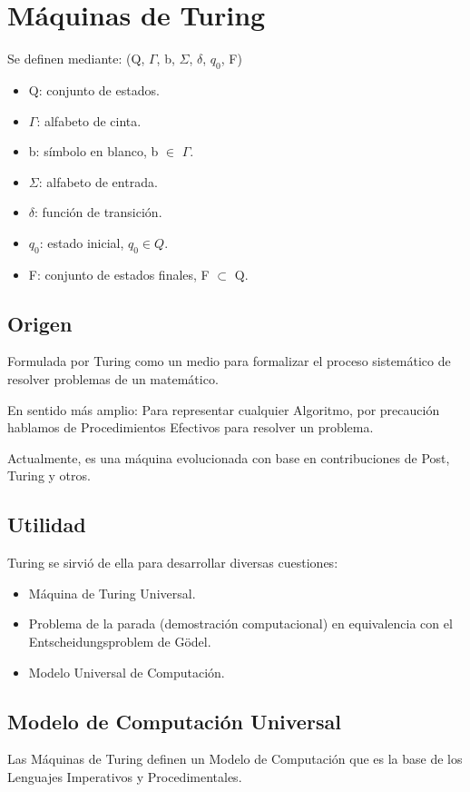 \section{Máquinas de Turing}
Se definen mediante: (Q, $\Gamma$, b, $\Sigma$, $\delta$, $q_0$, F)
\begin{itemize}
	\item Q: conjunto de estados.
	\item $\Gamma$: alfabeto de cinta.
	\item b: símbolo en blanco, b $\in$ $\Gamma$.
	\item $\Sigma$: alfabeto de entrada.
	\item $\delta$: función de transición.
	\item $q_0$: estado inicial, $q_0 \in Q$.
	\item F: conjunto de estados finales, F $\subset$ Q.
\end{itemize}

\subsection{Origen}
Formulada por Turing como un medio para formalizar el proceso sistemático de resolver problemas de un matemático.

En sentido más amplio: Para representar cualquier Algoritmo, por precaución hablamos de Procedimientos Efectivos para resolver un problema.

Actualmente, es una máquina evolucionada con base en contribuciones de Post, Turing y otros.

\subsection{Utilidad}
Turing se sirvió de ella para desarrollar diversas cuestiones:
\begin{itemize}
	\item Máquina de Turing Universal.
	\item Problema de la parada (demostración computacional) en equivalencia con el Entscheidungsproblem de Gödel.
	\item Modelo Universal de Computación.
\end{itemize}

\subsection{Modelo de Computación Universal}
Las Máquinas de Turing definen un Modelo de Computación que es la base de los Lenguajes Imperativos y Procedimentales.

